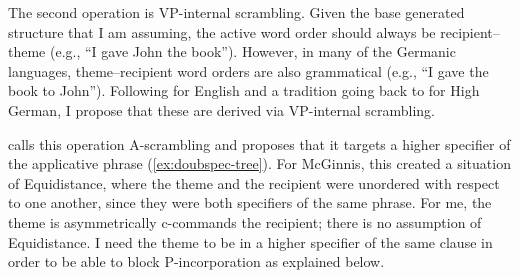 The second operation is VP-internal scrambling. Given the base generated structure that I am assuming, the active word order should always be recipient--theme (e.g., ``I gave John the book''). However, in many of the Germanic languages, theme--recipient word orders are also grammatical (e.g., ``I gave the book to John''). Following \cite{Takano.1998} for English and a tradition going back to \cite{Lenerz.1977} for High German, I propose that these are derived via VP-internal scrambling.

\cite{McGinnis.1998} calls this operation A-scrambling and proposes that it targets a higher specifier of the applicative phrase (\ref{ex:doubspec-tree}). For McGinnis, this created a situation of Equidistance, where the theme and the recipient were unordered with respect to one another, since they were both specifiers of the same phrase. For me, the theme is asymmetrically c-commands the recipient; there is no assumption of Equidistance. I need the theme to be in a higher specifier of the same clause in order to be able to block P-incorporation as explained below. 

